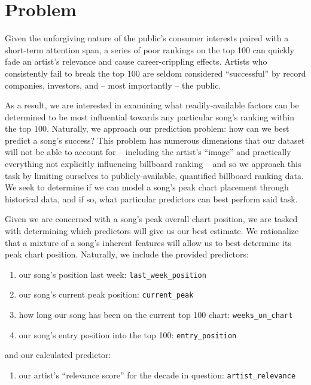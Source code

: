 \documentclass[11pt]{article} %
\begin{document}
\section*{Problem}
Given the unforgiving nature of the public's consumer interests paired with a short-term attention span, a series of poor rankings on the top 100 can quickly fade an artist's relevance and cause career-crippling effects. Artists who consistently fail to break the top 100 are seldom considered ``successful'' by record companies, investors, and -- most importantly -- the public. \par 

As a result, we are interested in examining what readily-available factors can be determined to be most influential towards any particular song's ranking within the top 100. Naturally, we approach our prediction problem: how can we best predict a song's success? This problem has numerous dimensions that our dataset will not be able to account for -- including the artist's ``image'' and practically everything not explicitly influencing billboard ranking -- and so we approach this task by limiting ourselves to publicly-available, quantified billboard ranking data. We seek to determine if we can model a song's peak chart placement through historical data, and if so, what particular predictors can best perform said task. \par

Given we are concerned with a song's peak overall chart position, we are tasked with determining which predictors will give us our best estimate. We rationalize that a mixture of a song's inherent features will allow us to best determine its peak chart position. Naturally, we include the provided predictors:
\begin{enumerate}
	\item our song's position last week: \texttt{last\_week\_position}
	\item our song's current peak position: \texttt{current\_peak}
	\item how long our song has been on the current top 100 chart: \texttt{weeks\_on\_chart}
	\item our song's entry position into the top 100: \texttt{entry\_position}
	
\end{enumerate}

and our calculated predictor:
\begin{enumerate}
	\item our artist's ``relevance score'' for the decade in question: \texttt{artist\_relevance}
\end{enumerate}
\end{document}
